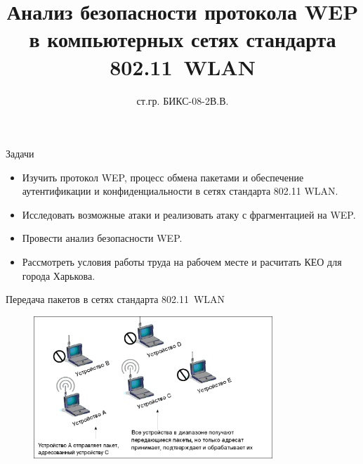 \documentclass[12pt]{beamer}
\begin{document}
\def\ministry{Министерство образования и науки, молодёжи и спорта Украины}
\title{Анализ безопасности протокола WEP в компьютерных сетях стандарта 802.11~WLAN}
\def\done{Выполнил}
\author{ст.гр. БИКС-08-2 В.В.}
\def\whochiefed{Руководитель}
\def\chief{ст.преп. Олешко О.И.}
\date{}

\frame{\titlepage} 


\begin{frame}{Задачи}

    \begin{itemize}
        \item Изучить протокол WEP, процесс обмена пакетами и обеспечение аутентификации и конфиденциальности в сетях стандарта 802.11 WLAN.
        \item Исследовать возможные атаки и реализовать атаку с фрагментацией на WEP.
        \item Провести анализ безопасности WEP.
        \item Рассмотреть условия работы труда на рабочем месте и расчитать КЕО для города Харькова.
    \end{itemize}

\end{frame} 


\begin{frame}{Передача пакетов в сетях стандарта 802.11~WLAN}

    \begin{figure}
        \includegraphics[width=9cm]{graphics/wlan_diagram.eps}
    \end{figure}

\end{frame} 
\end{document}
